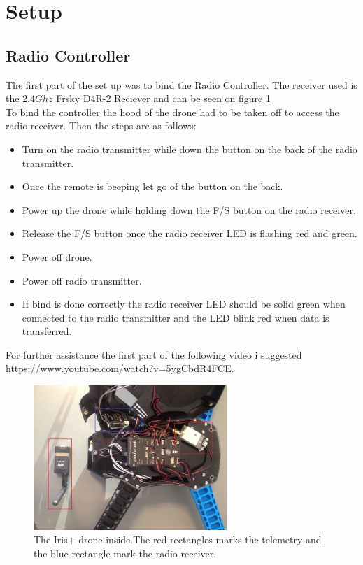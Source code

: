 \section{Setup}
\subsection*{Radio Controller}
The first part of the set up was to bind the Radio Controller. The receiver used is the $2.4 Ghz$ Frsky D4R-2 Reciever \cite{Ref:FrSky} and can be seen on figure \ref{fig:irisInside}\\ 
To bind the controller the hood of the drone had to be taken off to access the radio receiver. Then the steps are as follows:
\begin{itemize}
\item[1.] Turn on the radio transmitter while down the button on the back of the radio transmitter.
\item[2.] Once the remote is beeping let go of the button on the back.
\item[3.] Power up the drone while holding down the F/S button on the radio receiver.
\item[4.] Release the F/S button once the radio receiver LED is flashing red and green.
\item[5.] Power off drone.
\item[6.] Power off radio transmitter.
\item[7.] If bind is done correctly the radio receiver LED should be solid green when connected to the radio transmitter and the LED blink red when data is transferred.
\end{itemize}
For further assistance the first part of the following video i suggested \url{https://www.youtube.com/watch?v=5ygCbdR4FCE}.

\begin{figure}[H]
  \centering
    \includegraphics[width=0.65\textwidth]{./Images/insideIRIS}
  \caption{The Iris+ drone inside.The red rectangles marks the telemetry and the blue rectangle mark the radio receiver.}
  \label{fig:irisInside}
\end{figure}

